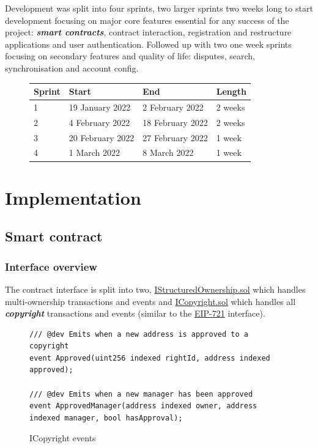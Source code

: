 \documentclass[12pt]{article}
\newcommand{\keyword}[1]{\textbf{\textit{#1}}}
\begin{document}
Development was split into four sprints, two larger sprints two weeks long to start development focusing on major core features essential for any success of the project: \keyword{smart contracts}, contract interaction, registration and restructure applications and user authentication. Followed up with two one week sprints focusing on secondary features and quality of life: disputes, search, synchronisation and account config. 

\begin{figure}[H]
\hfil
\begin{tabular}{|l|l|l|l|}
\hline
Sprint & Start            & End              & Length  \\ \hline
1      & 19 January 2022  & 2 February 2022  & 2 weeks \\ \hline
2      & 4 February 2022  & 18 February 2022 & 2 weeks \\ \hline
3      & 20 February 2022 & 27 February 2022 & 1 week  \\ \hline
4      & 1 March 2022     & 8 March 2022     & 1 week  \\ \hline
\end{tabular}
\end{figure}

\section{Implementation}

\subsection{Smart contract}

\subsubsection{Interface overview}


The contract interface is split into two, \href{https://github.com/MrHarrisonBarker/CRPL/blob/main/CRPL.Contracts/contracts/IStructuredOwnership.sol}{IStructuredOwnership.sol} which handles multi-ownership transactions and events and \href{https://github.com/MrHarrisonBarker/CRPL/blob/main/CRPL.Contracts/contracts/ICopyright.sol}{ICopyright.sol} which handles all \keyword{copyright} transactions and events (similar to the \href{https://eips.ethereum.org/EIPS/eip-721}{EIP-721} interface).

\begin{figure}[H]
\caption{ICopyright events}
\begin{lstlisting}[language=Solidity]
/// @dev Emits when a new address is approved to a copyright
event Approved(uint256 indexed rightId, address indexed approved);

/// @dev Emits when a new manager has been approved
event ApprovedManager(address indexed owner, address indexed manager, bool hasApproval);
\end{lstlisting}
\end{figure}
\end{document}
